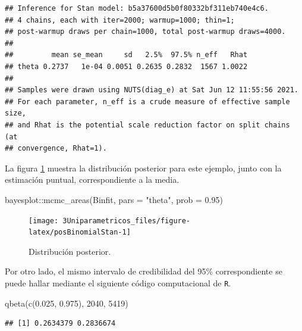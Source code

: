 \documentclass[
  10pt,
  spanish,
]{book}
\newenvironment{Shaded}{\begin{snugshade}}{\end{snugshade}}
\newcommand{\AttributeTok}[1]{\textcolor[rgb]{0.77,0.63,0.00}{#1}}
\newcommand{\DecValTok}[1]{\textcolor[rgb]{0.00,0.00,0.81}{#1}}
\newcommand{\FloatTok}[1]{\textcolor[rgb]{0.00,0.00,0.81}{#1}}
\newcommand{\FunctionTok}[1]{\textcolor[rgb]{0.00,0.00,0.00}{#1}}
\newcommand{\NormalTok}[1]{#1}
\newcommand{\SpecialCharTok}[1]{\textcolor[rgb]{0.00,0.00,0.00}{#1}}
\newcommand{\StringTok}[1]{\textcolor[rgb]{0.31,0.60,0.02}{#1}}
\theoremstyle{definition}
\theoremstyle{definition}
\theoremstyle{definition}
\theoremstyle{definition}
\theoremstyle{remark}
\begin{document}
\begin{verbatim}
## Inference for Stan model: b5a37600d5b0f80332bf311eb740e4c6.
## 4 chains, each with iter=2000; warmup=1000; thin=1; 
## post-warmup draws per chain=1000, total post-warmup draws=4000.
## 
##         mean se_mean     sd   2.5%  97.5% n_eff   Rhat
## theta 0.2737   1e-04 0.0051 0.2635 0.2832  1567 1.0022
## 
## Samples were drawn using NUTS(diag_e) at Sat Jun 12 11:55:56 2021.
## For each parameter, n_eff is a crude measure of effective sample size,
## and Rhat is the potential scale reduction factor on split chains (at 
## convergence, Rhat=1).
\end{verbatim}

La figura \ref{fig:posBinomialStan} muestra la distribución posterior para este ejemplo, junto con la estimación puntual, correspondiente a la media.

\begin{Shaded}
\begin{Highlighting}[]
\NormalTok{bayesplot}\SpecialCharTok{::}\FunctionTok{mcmc\_areas}\NormalTok{(Binfit, }\AttributeTok{pars =} \StringTok{"theta"}\NormalTok{, }
                      \AttributeTok{prob =} \FloatTok{0.95}\NormalTok{)}
\end{Highlighting}
\end{Shaded}

\begin{figure}

{\centering \texttt{[image: 3Uniparametricos\_files/figure-latex/posBinomialStan-1]} 

}

\caption{Distribución posterior.}\label{fig:posBinomialStan}
\end{figure}

Por otro lado, el mismo intervalo de credibilidad del 95\% correspondiente se puede hallar mediante el siguiente código computacional de \texttt{R}.

\begin{Shaded}
\begin{Highlighting}[]
\FunctionTok{qbeta}\NormalTok{(}\FunctionTok{c}\NormalTok{(}\FloatTok{0.025}\NormalTok{, }\FloatTok{0.975}\NormalTok{), }\DecValTok{2040}\NormalTok{, }\DecValTok{5419}\NormalTok{)}
\end{Highlighting}
\end{Shaded}

\begin{verbatim}
## [1] 0.2634379 0.2836674
\end{verbatim}
\end{document}

